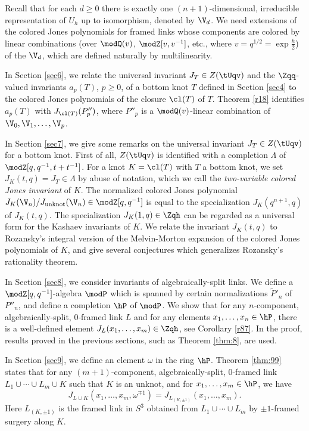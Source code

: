 \documentclass{amsart}
\numberwithin{equation}{section}
\numberwithin{figure}{section}
\theoremstyle{plain}
\theoremstyle{definition}
\theoremstyle{remark}
\begin{document}
Recall that for each $d\ge 0$ there is exactly one $(n+1)$-dimensional,
irreducible representation of $U_h$ up to isomorphism, denoted by
$\V_d$.  We need extensions of the colored Jones polynomials for
framed links whose components are colored by linear combinations (over
$\modQ (v)$, $\modZ [v,v^{-1}]$, etc., where $v=q^{1/2}=\exp\frac h2$) of the
$\V_d$, which are defined naturally by multilinearity.

In Section \ref{sec6}, we relate the universal invariant
$J_T\in Z(\tUqv)$ and the $\Zqq$-valued invariants $a_p(T)$, $p\ge 0$, of
a bottom knot $T$ defined in Section \ref{sec4} to the colored Jones
polynomials of the closure $\cl(T)$ of $T$.  Theorem \ref{r18}
identifies $a_p(T)$ with $J_{\cl(T)}(P''_p)$, where $P''_p$ is a
$\modQ (v)$-linear combination of $\V_0,\V_1,\ldots,\V_p$.

In Section \ref{sec7}, we give some remarks on the universal invariant
$J_T\in Z(\tUqv)$ for a bottom knot.  First of all, $Z(\tUqv)$ is
identified with a completion $\Lambda $ of $\modZ [q,q^{-1},t+t^{-1}]$.  For a
knot $K=\cl(T)$ with $T$ a bottom knot, we set $J_K(t,q)=J_T\in \Lambda $ by
abuse of notation, which we call the {\em two-variable colored Jones
invariant} of $K$.  The normalized colored Jones polynomial
$J_K(\V_n)/J_{\text{unknot}}(\V_n)\in \modZ [q,q^{-1}]$ is equal to the
specialization $J_K(q^{n+1},q)$ of $J_K(t,q)$.  The specialization
$J_K(1,q)\in \Zqh$ can be regarded as a universal form for the Kashaev
invariants of $K$.  We relate the invariant $J_K(t,q)$ to Rozansky's
integral version of the Melvin-Morton expansion of the colored Jones
polynomials of $K$, and give several conjectures which generalizes
Rozansky's rationality theorem.

In Section \ref{sec8}, we consider invariants of algebraically-split
links.  We define a $\modZ [q,q^{-1}]$-algebra $\modP $ which is spanned by
certain normalizations $\tilde P'_n$ of $P''_n$, and define a
completion $\hP$ of $\modP $.  We show that for any $n$-component,
algebraically-split, $0$-framed link $L$ and for any elements
$x_1,\ldots,x_n\in \hP$, there is a well-defined element
$J_L(x_1,\ldots,x_m)\in \Zqh$, see Corollary \ref{r87}.  In the proof,
results proved in the previous sections, such as Theorem \ref{thm:8},
are used.

In Section \ref{sec9}, we define an element $\omega $ in the ring $\hP$.
Theorem \ref{thm:99} states that for any $(m+1)$-component,
algebraically-split, $0$-framed link $L_1\cup \cdots\cup L_m\cup K$ such that $K$
is an unknot, and for $x_1,\ldots,x_m\in \hP$, we have
\begin{equation*}
  J_{L\cup K}(x_1,\ldots,x_m,\omega ^{\mp1})=J_{L_{(K,\pm 1)}}(x_1,\ldots,x_m).
\end{equation*}
Here $L_{(K,\pm 1)}$ is the framed link in $S^3$ obtained from
$L_1\cup \cdots\cup L_m$ by $\pm 1$-framed surgery along $K$.
\end{document}
